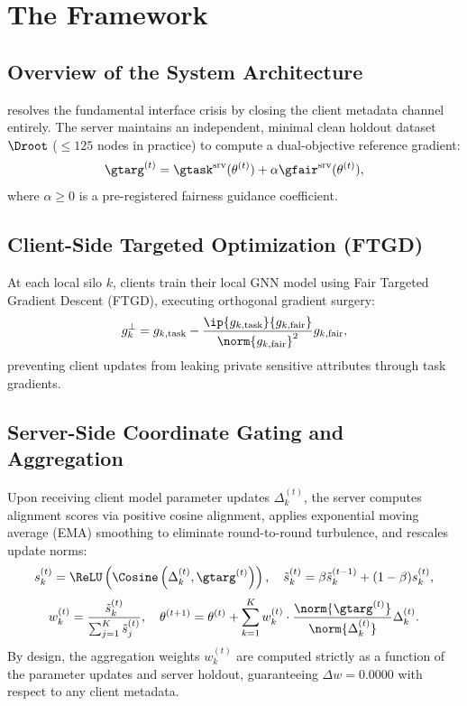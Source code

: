 \section{The \MethodName{} Framework}
\label{sec:methodology}

\subsection{Overview of the System Architecture}
\MethodName{} resolves the fundamental interface crisis by closing the client metadata channel entirely. The server maintains an independent, minimal clean holdout dataset $\Droot$ ($\le 125$ nodes in practice) to compute a dual-objective reference gradient:
\begin{equation}
\gtarg^{(t)} = \gtask^{\mathrm{srv}}(\theta^{(t)}) + \alpha \gfair^{\mathrm{srv}}(\theta^{(t)}),
\end{equation}
where $\alpha \ge 0$ is a pre-registered fairness guidance coefficient.

\subsection{Client-Side Targeted Optimization (FTGD)}
At each local silo $k$, clients train their local GNN model using Fair Targeted Gradient Descent (FTGD), executing orthogonal gradient surgery:
\begin{equation}
g_k^{\perp} = g_{k,\mathrm{task}} - \frac{\ip{g_{k,\mathrm{task}}}{g_{k,\mathrm{fair}}}}{\norm{g_{k,\mathrm{fair}}}^2} g_{k,\mathrm{fair}},
\end{equation}
preventing client updates from leaking private sensitive attributes through task gradients.

\subsection{Server-Side Coordinate Gating and Aggregation}
Upon receiving client model parameter updates $\Delta_k^{(t)}$, the server computes alignment scores via positive cosine alignment, applies exponential moving average (EMA) smoothing to eliminate round-to-round turbulence, and rescales update norms:
\begin{equation}
s_k^{(t)} = \ReLU\left(\Cosine\left(\Delta_k^{(t)}, \gtarg^{(t)}\right)\right), \quad \tilde{s}_k^{(t)} = \beta \tilde{s}_k^{(t-1)} + (1-\beta) s_k^{(t)},
\end{equation}
\begin{equation}
w_k^{(t)} = \frac{\tilde{s}_k^{(t)}}{\sum_{j=1}^K \tilde{s}_j^{(t)}}, \quad \theta^{(t+1)} = \theta^{(t)} + \sum_{k=1}^K w_k^{(t)} \cdot \frac{\norm{\gtarg^{(t)}}}{\norm{\Delta_k^{(t)}}} \Delta_k^{(t)}.
\end{equation}
By design, the aggregation weights $w_k^{(t)}$ are computed strictly as a function of the parameter updates and server holdout, guaranteeing $\Delta w = 0.0000$ with respect to any client metadata.
